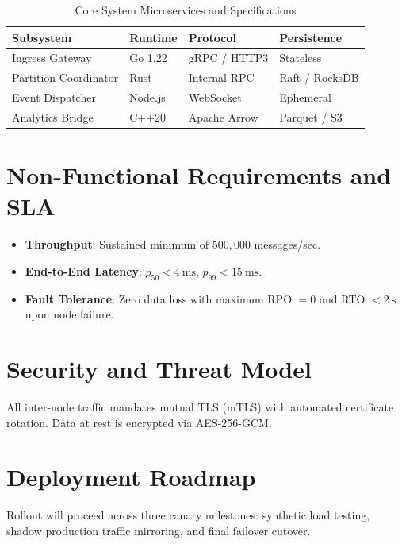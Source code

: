 \documentclass[11pt,a4paper]{article}
\begin{document}
\begin{table}[htbp]
\centering
\caption{Core System Microservices and Specifications}
\label{tab:components}
\begin{tabular}{llll}
\toprule
\textbf{Subsystem} & \textbf{Runtime} & \textbf{Protocol} & \textbf{Persistence} \\
\midrule
Ingress Gateway & Go 1.22 & gRPC / HTTP3 & Stateless \\
Partition Coordinator & Rust & Internal RPC & Raft / RocksDB \\
Event Dispatcher & Node.js & WebSocket & Ephemeral \\
Analytics Bridge & C++20 & Apache Arrow & Parquet / S3 \\
\bottomrule
\end{tabular}
\end{table}

\section{Non-Functional Requirements and SLA}
\begin{itemize}
    \item \textbf{Throughput}: Sustained minimum of $500{,}000$ messages/sec.
    \item \textbf{End-to-End Latency}: $p_{50} < \qty{4}{\milli\second}$, $p_{99} < \qty{15}{\milli\second}$.
    \item \textbf{Fault Tolerance}: Zero data loss with maximum RPO $= 0$ and RTO $< \qty{2}{\second}$ upon node failure.
\end{itemize}

\section{Security and Threat Model}
All inter-node traffic mandates mutual TLS (mTLS) with automated certificate rotation. Data at rest is encrypted via AES-256-GCM.

\section{Deployment Roadmap}
Rollout will proceed across three canary milestones: synthetic load testing, shadow production traffic mirroring, and final failover cutover.
\end{document}
